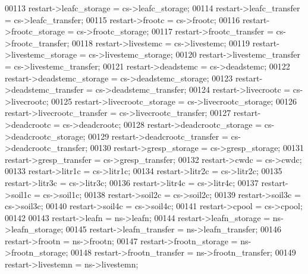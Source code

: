 \begin{DoxyCode}
00113     restart->leafc\_storage                    = cs->leafc\_storage;
00114     restart->leafc\_transfer                   = cs->leafc\_transfer;
00115     restart->frootc                           = cs->frootc;
00116     restart->frootc\_storage                   = cs->frootc\_storage;
00117     restart->frootc\_transfer                  = cs->frootc\_transfer;
00118     restart->livestemc                        = cs->livestemc;
00119     restart->livestemc\_storage                = cs->livestemc\_storage;
00120     restart->livestemc\_transfer               = cs->livestemc\_transfer;
00121     restart->deadstemc                        = cs->deadstemc;
00122     restart->deadstemc\_storage                = cs->deadstemc\_storage;
00123     restart->deadstemc\_transfer               = cs->deadstemc\_transfer;
00124     restart->livecrootc                       = cs->livecrootc;
00125     restart->livecrootc\_storage               = cs->livecrootc\_storage;
00126     restart->livecrootc\_transfer              = cs->livecrootc\_transfer;
00127     restart->deadcrootc                       = cs->deadcrootc;
00128     restart->deadcrootc\_storage               = cs->deadcrootc\_storage;
00129     restart->deadcrootc\_transfer              = cs->deadcrootc\_transfer;
00130     restart->gresp\_storage                    = cs->gresp\_storage;
00131     restart->gresp\_transfer                   = cs->gresp\_transfer;
00132     restart->cwdc                             = cs->cwdc;
00133     restart->litr1c                           = cs->litr1c;
00134     restart->litr2c                           = cs->litr2c;
00135     restart->litr3c                           = cs->litr3c;
00136     restart->litr4c                           = cs->litr4c;
00137     restart->soil1c                           = cs->soil1c;
00138     restart->soil2c                           = cs->soil2c;
00139     restart->soil3c                           = cs->soil3c;
00140     restart->soil4c                           = cs->soil4c;
00141     restart->cpool                            = cs->cpool;
00142 
00143     restart->leafn                            = ns->leafn;
00144     restart->leafn\_storage                    = ns->leafn\_storage;
00145     restart->leafn\_transfer                   = ns->leafn\_transfer;
00146     restart->frootn                           = ns->frootn;
00147     restart->frootn\_storage                   = ns->frootn\_storage;
00148     restart->frootn\_transfer                  = ns->frootn\_transfer;
00149     restart->livestemn                        = ns->livestemn;

\end{DoxyCode}
